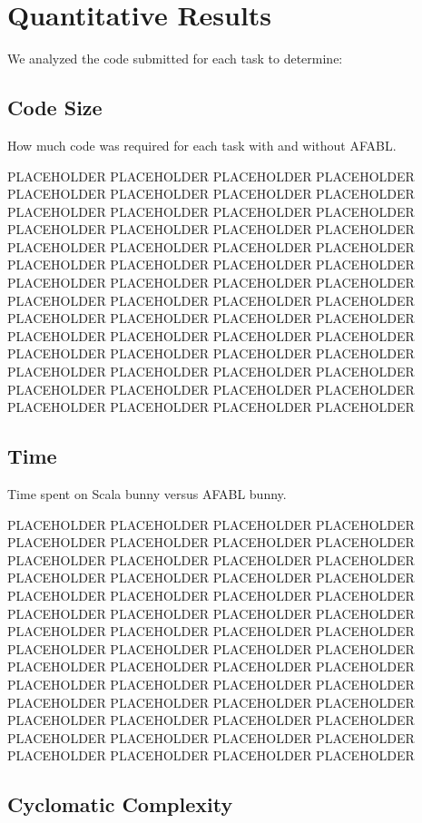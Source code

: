 
\section{Quantitative Results}

We analyzed the code submitted for each task to determine:

\subsection{Code Size}

How much code was required for each task with and without AFABL.

PLACEHOLDER PLACEHOLDER PLACEHOLDER PLACEHOLDER PLACEHOLDER PLACEHOLDER PLACEHOLDER PLACEHOLDER PLACEHOLDER PLACEHOLDER PLACEHOLDER PLACEHOLDER PLACEHOLDER PLACEHOLDER PLACEHOLDER PLACEHOLDER PLACEHOLDER PLACEHOLDER PLACEHOLDER PLACEHOLDER PLACEHOLDER PLACEHOLDER PLACEHOLDER PLACEHOLDER PLACEHOLDER PLACEHOLDER PLACEHOLDER PLACEHOLDER PLACEHOLDER PLACEHOLDER PLACEHOLDER PLACEHOLDER PLACEHOLDER PLACEHOLDER PLACEHOLDER PLACEHOLDER PLACEHOLDER PLACEHOLDER PLACEHOLDER PLACEHOLDER PLACEHOLDER PLACEHOLDER PLACEHOLDER PLACEHOLDER PLACEHOLDER PLACEHOLDER PLACEHOLDER PLACEHOLDER PLACEHOLDER PLACEHOLDER PLACEHOLDER PLACEHOLDER PLACEHOLDER PLACEHOLDER PLACEHOLDER PLACEHOLDER

\subsection{Time}

Time spent on Scala bunny versus AFABL bunny.

PLACEHOLDER PLACEHOLDER PLACEHOLDER PLACEHOLDER PLACEHOLDER PLACEHOLDER PLACEHOLDER PLACEHOLDER PLACEHOLDER PLACEHOLDER PLACEHOLDER PLACEHOLDER PLACEHOLDER PLACEHOLDER PLACEHOLDER PLACEHOLDER PLACEHOLDER PLACEHOLDER PLACEHOLDER PLACEHOLDER PLACEHOLDER PLACEHOLDER PLACEHOLDER PLACEHOLDER PLACEHOLDER PLACEHOLDER PLACEHOLDER PLACEHOLDER PLACEHOLDER PLACEHOLDER PLACEHOLDER PLACEHOLDER PLACEHOLDER PLACEHOLDER PLACEHOLDER PLACEHOLDER PLACEHOLDER PLACEHOLDER PLACEHOLDER PLACEHOLDER PLACEHOLDER PLACEHOLDER PLACEHOLDER PLACEHOLDER PLACEHOLDER PLACEHOLDER PLACEHOLDER PLACEHOLDER PLACEHOLDER PLACEHOLDER PLACEHOLDER PLACEHOLDER PLACEHOLDER PLACEHOLDER PLACEHOLDER PLACEHOLDER

\subsection{Cyclomatic Complexity}


